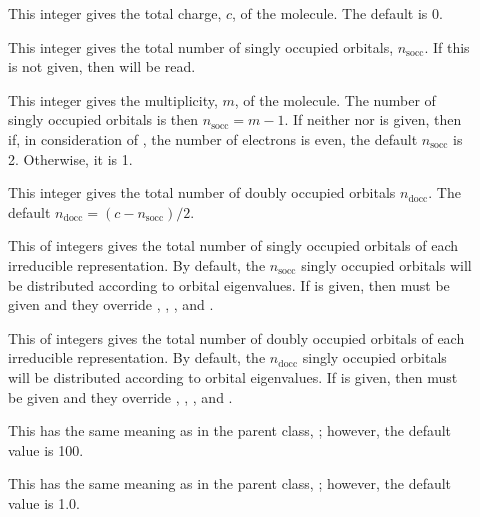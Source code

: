 \begin{description}
  \item[] This integer gives the total charge, $c$, of
     the molecule.  The default is 0.

  \item[] This integer gives the total number of singly
     occupied orbitals, $n_\mathrm{socc}$.  If this is not given, then
      will be read.

  \item[] This integer gives the multiplicity, $m$, of
     the molecule.  The number of singly occupied orbitals is then
     $n_\mathrm{socc} = m - 1$.  If neither  nor
      is given, then if, in consideration of
     , the number of electrons is even, the default
     $n_\mathrm{socc}$ is 2.  Otherwise, it is 1.

  \item[] This integer gives the total number of doubly
     occupied orbitals $n_\mathrm{docc}$.  The default $n_\mathrm{docc} =
     (c - n_\mathrm{socc})/2$.

  \item[] This  of integers gives the
     total number of singly occupied orbitals of each irreducible
     representation.  By default, the $n_\mathrm{socc}$ singly occupied
     orbitals will be distributed according to orbital eigenvalues.  If
      is given, then  must be given and they
     override , , , and
     .

  \item[] This  of integers gives the
     total number of doubly occupied orbitals of each irreducible
     representation.  By default, the $n_\mathrm{docc}$ singly occupied
     orbitals will be distributed according to orbital eigenvalues.  If
      is given, then  must be given and they
     override , , , and
     .

  \item[] This has the same meaning as in the parent
     class, ; however, the default value is 100.

  \item[] This has the same meaning as in the parent
     class, ; however, the default value is 1.0.

\end{description}
